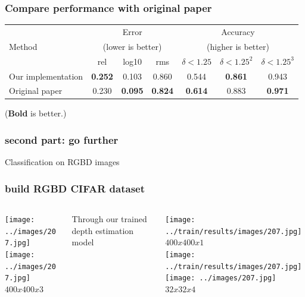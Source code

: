 \documentclass{beamer}
\begin{document}
\begin{frame}
\frametitle{Compare performance with original paper}
\begin{table} [t] \center
\resizebox{\linewidth}{!} {
\begin{tabular}{ | l |  c  c  c | c  c  c |}
\hline 
\multirow{3}{*}{{{Method}}} &\multicolumn{3}{c|}{Error} &\multicolumn{3}{c|}{Accuracy} \\
&\multicolumn{3}{c|}{(lower is better)} &\multicolumn{3}{c|}{(higher is better)} \\
\cline{2-7}
&rel &log10 &rms &$\delta < 1.25$ &$\delta < 1.25^2$ &$\delta < 1.25^3$  \\
\hline
%
%
Our implementation &\textbf{0.252}	 &0.103	  &0.860  	&0.544   	&\textbf{0.861}	&0.943  \\
Original paper    &0.230	 &\textbf{0.095} 	 &\textbf{0.824}  &\textbf{0.614} 	 &0.883	 &\textbf{0.971} \\
\hline
\end{tabular}
}
\end{table}
(\textbf{Bold} is better.)
\end{frame}


\begin{frame}
\frametitle{second part: go further}
\Huge{\centerline{Classification on RGBD images}}
\end{frame}


\begin{frame}
\frametitle{build RGBD CIFAR dataset}
\begin{columns}
\begin{column}{.3\textwidth}
\texttt{[image: ../images/207.jpg]}\\
\texttt{[image: ../images/207.jpg]}\\
$400x400x3$
\end{column}

\begin{column}{.2\textwidth}
Through our trained depth estimation model
\end{column}
\begin{column}{.4\textwidth}
\texttt{[image: ../train/results/images/207.jpg]}\\
$400x400x1$\\
\texttt{[image: ../train/results/images/207.jpg]}
\texttt{[image: ../images/207.jpg]}\\
$32x32x4$
\end{column}
\end{columns}
\end{frame}
\end{document}
